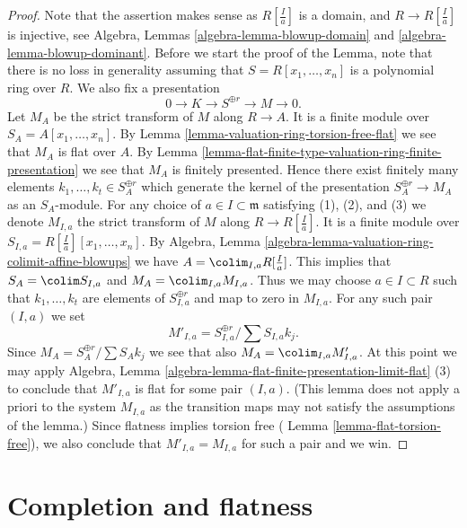 \begin{proof}
Note that the assertion makes sense as $R[\frac{I}{a}]$
is a domain, and $R \to R[\frac{I}{a}]$ is injective, see
Algebra, Lemmas \ref{algebra-lemma-blowup-domain} and
\ref{algebra-lemma-blowup-dominant}.
Before we start the proof of the Lemma, note that there is
no loss in generality assuming that $S = R[x_1, \ldots, x_n]$
is a polynomial ring over $R$. We also fix a presentation
$$
0 \to K \to S^{\oplus r} \to M \to 0.
$$
Let $M_A$ be the strict transform of $M$ along $R \to A$. It is a finite
module over $S_A = A[x_1, \ldots, x_n]$. By
Lemma \ref{lemma-valuation-ring-torsion-free-flat}
we see that $M_A$ is flat over $A$. By
Lemma \ref{lemma-flat-finite-type-valuation-ring-finite-presentation}
we see that $M_A$ is finitely presented. Hence there exist finitely many
elements $k_1, \ldots, k_t \in S_A^{\oplus r}$ which generate the
kernel of the presentation $S_A^{\oplus r} \to M_A$ as
an $S_A$-module. For any choice of $a \in I \subset \mathfrak m$
satisfying (1), (2), and (3) we denote $M_{I, a}$ the strict transform of
$M$ along $R \to R[\frac{I}{a}]$. It is a finite module over
$S_{I, a} = R[\frac{I}{a}][x_1, \ldots, x_n]$. By
Algebra, Lemma \ref{algebra-lemma-valuation-ring-colimit-affine-blowups}
we have $A = \colim_{I, a} R[\frac{I}{a}]$.
This implies that $S_A = \colim S_{I, a}$ and
$M_A = \colim_{I, a} M_{I, a}$.
Thus we may choose $a \in I \subset R$ such that
$k_1, \ldots, k_t$ are elements of $S_{I, a}^{\oplus r}$ and
map to zero in $M_{I, a}$. For any such pair $(I, a)$ we set
$$
M'_{I, a} = S_{I, a}^{\oplus r}/ \sum S_{I, a}k_j.
$$
Since $M_A = S_A^{\oplus r}/ \sum S_Ak_j$ we see that also
$M_A = \colim_{I, a} M'_{I, a}$.
At this point we may apply
Algebra, Lemma \ref{algebra-lemma-flat-finite-presentation-limit-flat} (3)
to conclude that $M'_{I, a}$ is flat for some pair $(I, a)$.
(This lemma does not apply a priori to the system $M_{I, a}$
as the transition maps may not satisfy the assumptions of the lemma.)
Since flatness implies torsion free (
Lemma \ref{lemma-flat-torsion-free}),
we also conclude that $M'_{I, a} = M_{I, a}$ for such a pair and we win.
\end{proof}












\section{Completion and flatness}
\label{section-completion-flat}

